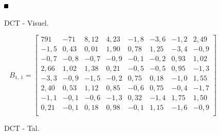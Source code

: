 \begin{figure}[!h]
\begin{minipage}[b]{0.25\linewidth}
\centering
\includegraphics[width=\textwidth]{Billeder/LenaAnvendelse/RED8x8/lena2-R8x8-DCT.png}
\caption{DCT - Visuel.}
\label{fig:lena2-R8x8-DCT-visuel}
\end{minipage}
\hspace{0.5cm}
\begin{minipage}[b]{0.40\linewidth}
\centering
\[B_{1,\ 1}=\begin{bmatrix}
791    & -71  & 8,12   & 4,23   & -1,8  & -3,6  & -1,2  & 2,49   \\
-1,5  & 0,43  & 0,01   & 1,90   & 0,78  & 1,25   & -3,4  & -0,9 \\
-0,7 & -0,8 & -0,7 & -0,9 & -0,1 & -0,2 & 0,93  & 1,02   \\
2,66   & 1,02   & 1,38   & 0,21  & -0,5 & -0,5 & 0,95  & -1,3  \\
-3,3  & -0,9 & -1,5  & -0,2 & 0,75  & 0,18  & -1,0  & 1,55   \\
2,40   & 0,53  & 1,12   & 0,85  & -0,6 & 0,75  & -0,4 & -1,7  \\
-1,1  & -0,1 & -0,6 & -1,3  & 0,32  & -1,4  & 1,75   & 1,50   \\
0,21  & -0,1 & 0,18  & 0,98  & -0,1 & 1,15   & -1,6  & -0,9 \\
\end{bmatrix}\]
\caption{DCT - Tal.}
\label{fig:lena2-R8x8-DCT-matrix}
\end{minipage}
\end{figure}

